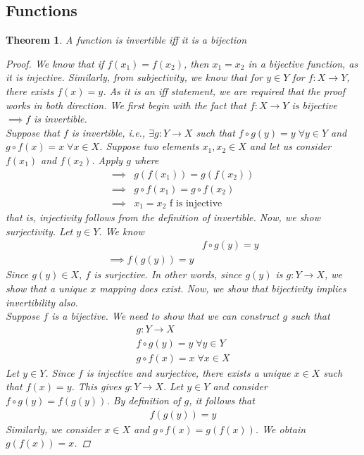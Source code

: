 \documentclass[a4paper]{article}
\theoremstyle{plain}
\newtheorem{thm}{Theorem}[section]
\theoremstyle{definition}
\theoremstyle{remark}
\begin{document}
\subsection{Functions}
\begin{thm}
	A function is invertible iff it is a bijection
	\begin{proof}
		We know that if $f(x_1) = f(x_2)$, then $x_1=x_2$ in a bijective function, as it is injective. Similarly, from subjectivity, we know that for $y \in Y$ for $f: X \to Y$, there exists  $f(x) = y$. As it is an iff statement, we are required that the proof works in both direction. We first begin with the fact that $f: X \to Y$ is bijective $\implies f$ is invertible. \\
		Suppose that $f$ is invertible, i.e., $\exists g : Y \to X$ such that $f \circ g(y) = y  \; \forall y \in Y$ and $g \circ f (x) = x \; \forall x \in X$. Suppose two elements $x_1,x_2 \in X$ and let us consider $f(x_1)$ and $f(x_2)$. Apply $g$ where
		\begin{align*}
			\implies &g(f(x_1)) = g(f(x_2)) \\
			\implies &g \circ f(x_1) = g\circ f(x_2)\\
			\implies &x_1=x_2 \text{ f is injective}
		\end{align*}
		that is, injectivity follows from the definition of invertible. Now, we show surjectivity. Let $y \in Y$. We know 
		\begin{align*}
			&f \circ g ( y) = y \\
			\implies f(g(y)) =y
		\end{align*}
		Since $g(y) \in X$, $f$ is surjective. In other words, since $g(y)$ is $g : Y \to X$, we show that a unique $x$ mapping does exist. Now, we show that bijectivity implies invertibility also. \\
		Suppose $f$ is a bijective. We need to show that we can construct $g$ such that
		\begin{align*}
			g: Y \to X \\
			f \circ g (y) = y \; \forall y \in Y \\
			g \circ f (x) = x \; \forall x \in X
		\end{align*}
		Let $y \in Y$. Since $f$ is injective and surjective, there exists a unique $x \in X$ such that $f(x) = y$. This gives $g : Y \to  X$. Let $y \in Y$ and consider $f \circ g ( y) = f(g(y))$. By definition of $g$, it follows that
		\begin{align*}
			f(g(y)) = y
		\end{align*}
		Similarly, we consider $x \in X$ and $g\circ f (x) = g(f(x))$. We obtain $g(f(x)) = x$.
	\end{proof}
\end{thm}
\end{document}
